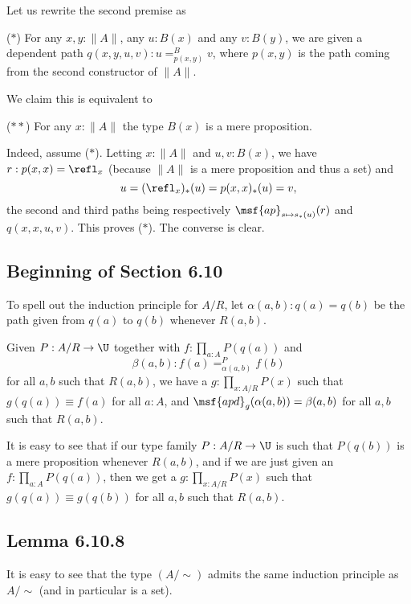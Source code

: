\documentclass[12pt]{article}
\begin{document}
Let us rewrite the second premise as

\nn($*$) For any $x,y:\lVert A\rVert$, any $u:B(x)$ and any $v:B(y)$, we are given a dependent path $q(x,y,u,v):u=^B_{p(x,y)}v$, where $p(x,y)$ is the path coming from the second constructor of $\lVert A\rVert$.

We claim this is equivalent to 

\nn($**$) For any $x:\lVert A\rVert$ the type $B(x)$ is a mere proposition.

Indeed, assume ($*$). Letting $x:\lVert A\rVert$ and $u,v:B(x)$, we have $r:p(x,x)=\refl_x$ (because $\lVert A\rVert$ is a mere proposition and thus a set) and 
$$
u=(\refl_x)_*(u)=p(x,x)_*(u)=v,
$$ 
the second and third paths being respectively $\msf{ap}_{s\mapsto s_*(u)}(r)$ and $q(x,x,u,v)$. This proves ($*$). The converse is clear.


\subsection{Beginning of Section 6.10}

To spell out the induction principle for $A/R$, let $\alpha(a,b):q(a)=q(b)$ be the path given from $q(a)$ to $q(b)$ whenever $R(a,b)$. 

Given $P:A/R\to\U$ together with $f:\prod_{a:A}P(q(a))$ and 
$$
\beta(a,b):f(a)=^P_{\alpha(a,b)}f(b)
$$ 
for all $a,b$ such that $R(a,b)$, we have a $g:\prod_{x:A/R}P(x)$ such that $g(q(a))\equiv f(a)$ for all $a:A$, and $\msf{apd}_g(\alpha(a,b))=\beta(a,b)$ for all $a,b$ such that $R(a,b)$.

It is easy to see that if our type family $P:A/R\to\U$ is such that $P(q(b))$ is a mere proposition whenever $R(a,b)$, and if we are just given an $f:\prod_{a:A}P(q(a))$, then we get a $g:\prod_{x:A/R}P(x)$ such that $g(q(a))\equiv g(q(b))$ for all $a,b$ such that $R(a,b)$.


\subsection{Lemma 6.10.8}


It is easy to see that the type $(A/\sim)$ admits the same induction principle as $A/\sim$ (and in particular is a set).

\end{document}
